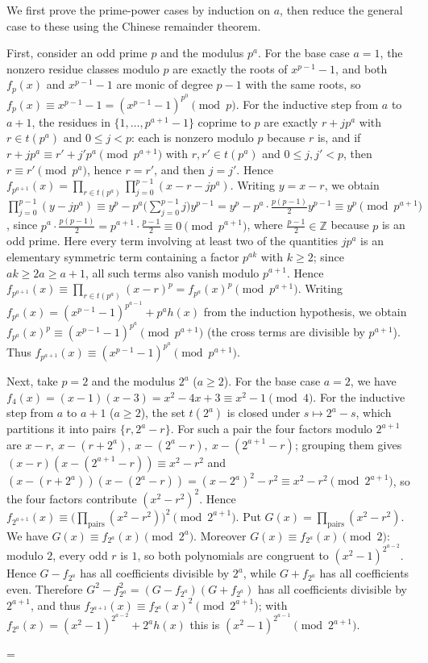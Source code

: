 \documentclass[11pt]{article}
\makeatletter
\theoremstyle{ntstyle}
\let\nt@closedisplay\]
\def\nt@guardedclose{\@ifnextchar\par{\nt@closeafterpar}{\@ifnextchar\end{\postdisplaypenalty\@M\nt@closedisplay}{\nt@closedisplay}}}
\def\nt@closeafterpar\par{\@ifnextchar\par{\nt@closeafterpar}{\@ifnextchar\end{\postdisplaypenalty\@M\nt@closedisplay\par}{\nt@closedisplay\par}}}
\renewenvironment{proof}[1][\proofname]{\par
  \pushQED{\qed}\normalfont\topsep\medskipamount\edef\nt@afterproof{\@endparpenalty=\the\@endparpenalty\relax}\@beginparpenalty\@M\@endparpenalty\@M\let\]\nt@guardedclose\trivlist\item[]\textit{#1\@addpunct{.}} \ignorespaces}{\ifvmode\addpenalty\@M\fi\popQED\nt@afterproof\endtrivlist\@endpefalse}
\makeatother
\begin{document}
\begin{proof} We first prove the prime-power cases by
	induction on $a$, then reduce the general case to these using the Chinese remainder theorem.

	First, consider an odd prime $p$ and the modulus $p^a$. For the base case $a =
		1$, the nonzero residue classes modulo $p$ are exactly the roots of $x^{p-1}
		- 1$, and both $f_p(x)$ and $x^{p-1} - 1$ are monic of degree $p-1$
	with the same roots, so $f_p(x) \equiv x^{p-1} - 1 =
			(x^{p-1}-1)^{p^{0}} \pmod{p}$. For the inductive step from $a$ to $a+1$, the
	residues in $\{1,\ldots,p^{a+1}-1\}$ coprime to $p$ are exactly $r+jp^a$ with $r\in t(p^a)$ and
	$0\le j<p$: each is nonzero modulo $p$ because $r$ is, and if $r+jp^a\equiv
	r'+j'p^a\pmod{p^{a+1}}$ with $r,r'\in t(p^a)$ and $0\le j,j'<p$, then $r\equiv r'\pmod{p^a}$,
	hence $r=r'$, and then $j=j'$. Hence $f_{p^{a+1}}(x) =
		\prod_{r \in t(p^{a})} \prod_{j=0}^{p-1}(x - r - j p^{a})$. Writing
	$y = x - r$, we obtain $\prod_{j=0}^{p-1}(y - j p^{a}) \equiv y^{p} -
		p^{a}\big(\textstyle\sum_{j=0}^{p-1} j\big) y^{p-1} = y^{p} -
		p^{a}\cdot\frac{p(p-1)}{2}y^{p-1} \equiv y^{p} \pmod{p^{a+1}}$, since
	$p^{a}\cdot\frac{p(p-1)}{2} = p^{a+1}\cdot\frac{p-1}{2}
		\equiv 0 \pmod{p^{a+1}}$, where $\frac{p-1}{2} \in \mathbb{Z}$ because
	$p$ is an odd prime. Here every term involving at least two of the quantities $jp^a$ is
	an elementary symmetric term containing a factor $p^{ak}$ with
	$k\ge2$; since $ak\ge2a\ge a+1$, all such terms also vanish modulo
	$p^{a+1}$. Hence $f_{p^{a+1}}(x) \equiv
		\prod_{r\in t(p^a)}(x-r)^p=f_{p^a}(x)^p \pmod{p^{a+1}}$. Writing
	$f_{p^{a}}(x) = (x^{p-1}-1)^{p^{a-1}} + p^{a} h(x)$ from the
	induction hypothesis, we obtain $f_{p^{a}}(x)^{p} \equiv (x^{p-1}-1)^{p^{a}}
		\pmod{p^{a+1}}$ (the cross terms are divisible by $p^{a+1}$). Thus
	$f_{p^{a+1}}(x) \equiv (x^{p-1}-1)^{p^{a}} \pmod{p^{a+1}}$.

	Next, take $p=2$ and the modulus $2^a$ ($a \ge 2$). For the base case $a = 2$, we have $f_4(x) =
	(x-1)(x-3) = x^{2} - 4x + 3
		\equiv x^{2} - 1 \pmod{4}$. For the inductive step from $a$ to $a+1$ ($a \ge 2$),
	the set $t(2^{a})$ is closed under $s \mapsto 2^{a} - s$, which partitions it
	into pairs $\{r, 2^{a}-r\}$. For such a pair the four factors modulo
	$2^{a+1}$ are $x - r,\ x - (r + 2^{a}),\ x - (2^{a} - r),\ x -
			(2^{a+1} - r)$; grouping them gives $(x-r)(x-(2^{a+1}-r)) \equiv x^{2} - r^{2}$
	and $(x-(r+2^{a}))(x-(2^{a}-r)) = (x-2^{a})^{2} - r^{2} \equiv x^{2}
		- r^{2} \pmod{2^{a+1}}$, so the four factors contribute $(x^{2}-r^{2})^{2}$.
	Hence $f_{2^{a+1}}(x) \equiv
		\big(\prod_{\text{pairs}}(x^{2}-r^{2})\big)^{2} \pmod{2^{a+1}}$.
	Put $G(x)=\prod_{\text{pairs}}(x^{2}-r^{2})$. We have $G(x)\equiv f_{2^{a}}(x)\pmod{2^{a}}$.
	Moreover $G(x)\equiv f_{2^{a}}(x)\pmod{2}$: modulo $2$, every odd $r$ is $1$, so both polynomials
	are congruent to $(x^2-1)^{2^{a-2}}$. Hence $G-f_{2^a}$ has all coefficients divisible by $2^a$,
	while $G+f_{2^a}$ has all coefficients even. Therefore $G^2-f_{2^a}^2=(G-f_{2^a})(G+f_{2^a})$ has
	all coefficients divisible by $2^{a+1}$, and thus $f_{2^{a+1}}(x) \equiv f_{2^{a}}(x)^{2}
		\pmod{2^{a+1}}$; with $f_{2^{a}}(x) = (x^{2}-1)^{2^{a-2}} + 2^{a}
		h(x)$ this is $(x^{2}-1)^{2^{a-1}} \pmod{2^{a+1}}$.


\end{proof}
\end{document}
